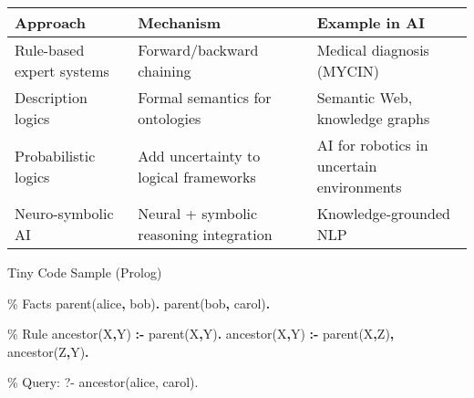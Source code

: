 \documentclass[
  letterpaper,
  DIV=11,
  numbers=noendperiod]{scrreprt}
\newenvironment{Shaded}{\begin{snugshade}}{\end{snugshade}}
\newcommand{\CommentTok}[1]{\textcolor[rgb]{0.37,0.37,0.37}{#1}}
\newcommand{\DataTypeTok}[1]{\textcolor[rgb]{0.68,0.00,0.00}{#1}}
\newcommand{\KeywordTok}[1]{\textcolor[rgb]{0.00,0.23,0.31}{\textbf{#1}}}
\newcommand{\NormalTok}[1]{\textcolor[rgb]{0.00,0.23,0.31}{#1}}
\begin{document}
\begin{longtable}[]{@{}
  >{\raggedright\arraybackslash}p{}
  >{\raggedright\arraybackslash}p{}
  >{\raggedright\arraybackslash}p{}@{}}
\toprule\noalign{}
\begin{minipage}[b]{\linewidth}\raggedright
Approach
\end{minipage} & \begin{minipage}[b]{\linewidth}\raggedright
Mechanism
\end{minipage} & \begin{minipage}[b]{\linewidth}\raggedright
Example in AI
\end{minipage} \\
\midrule\noalign{}
\endhead
\bottomrule\noalign{}
\endlastfoot
Rule-based expert systems & Forward/backward chaining & Medical
diagnosis (MYCIN) \\
Description logics & Formal semantics for ontologies & Semantic Web,
knowledge graphs \\
Probabilistic logics & Add uncertainty to logical frameworks & AI for
robotics in uncertain environments \\
Neuro-symbolic AI & Neural + symbolic reasoning integration &
Knowledge-grounded NLP \\
\end{longtable}

Tiny Code Sample (Prolog)

\begin{Shaded}
\begin{Highlighting}[]
\CommentTok{\% Facts}
\NormalTok{parent(alice}\KeywordTok{,}\NormalTok{ bob)}\KeywordTok{.}
\NormalTok{parent(bob}\KeywordTok{,}\NormalTok{ carol)}\KeywordTok{.}

\CommentTok{\% Rule}
\NormalTok{ancestor(}\DataTypeTok{X}\KeywordTok{,}\DataTypeTok{Y}\NormalTok{) }\KeywordTok{:{-}}\NormalTok{ parent(}\DataTypeTok{X}\KeywordTok{,}\DataTypeTok{Y}\NormalTok{)}\KeywordTok{.}
\NormalTok{ancestor(}\DataTypeTok{X}\KeywordTok{,}\DataTypeTok{Y}\NormalTok{) }\KeywordTok{:{-}}\NormalTok{ parent(}\DataTypeTok{X}\KeywordTok{,}\DataTypeTok{Z}\NormalTok{)}\KeywordTok{,}\NormalTok{ ancestor(}\DataTypeTok{Z}\KeywordTok{,}\DataTypeTok{Y}\NormalTok{)}\KeywordTok{.}

\CommentTok{\% Query: ?{-} ancestor(alice, carol).}
\end{Highlighting}
\end{Shaded}
\end{document}
